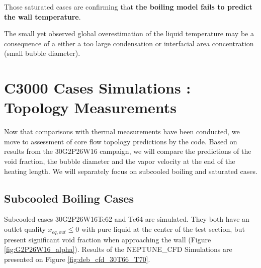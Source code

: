 \npar

Those saturated cases are confirming that \textbf{the boiling model fails to predict the wall temperature}. 


\begin{remark*}{}
The small yet observed global overestimation of the liquid temperature may be a consequence of a either a too large condensation or interfacial area concentration (\ie small bubble diameter). 
\end{remark*}




\section{C3000 Cases Simulations : Topology Measurements}

Now that comparisons with thermal measurements have been conducted, we move to assessment of core flow topology predictions by the code. Based on results from the 30G2P26W16 campaign, we will compare the predictions of the void fraction, the bubble diameter and the vapor velocity at the end of the heating length. We will separately focus on subcooled boiling and saturated cases.


\subsection{Subcooled Boiling Cases}

Subcooled cases 30G2P26W16Te62 and Te64 are simulated. They both have an outlet quality $x_{eq,out} \leq 0$ with pure liquid at the center of the test section, but present significant void fraction when approaching the wall (Figure \ref{fig:G2P26W16_alpha}). Results of the NEPTUNE\_CFD Simulations are presented on Figure \ref{fig:deb_cfd_30T66_T70}.

